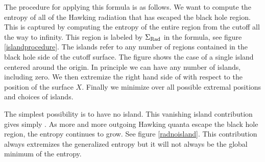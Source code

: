 
The procedure for applying this formula is as follows. We want to compute the entropy of all of the Hawking radiation that has escaped the black hole region. This is captured by computing the entropy of the entire region from the cutoff all the way to infinity. This region is labeled by $\Sigma_{\rm Rad}$  in the formula, see figure \ref{islandprocedure}. The islands refer to any number of regions contained in the black hole side of the cutoff surface. The figure shows the case of a single island centered around the origin. In principle we can have any number of islands, including zero. We then extremize the right hand side of 
 with respect to the position of the surface $X$. Finally we minimize over all possible extremal positions and choices of islands. 

The simplest possibility is to have no island. 
This vanishing island contribution gives simply .   As more and more outgoing Hawking quanta escape the black hole region, the entropy continues to grow. See figure \ref{radnoisland}. This contribution always extremizes the generalized entropy but it will not always be the global minimum of the entropy. 

